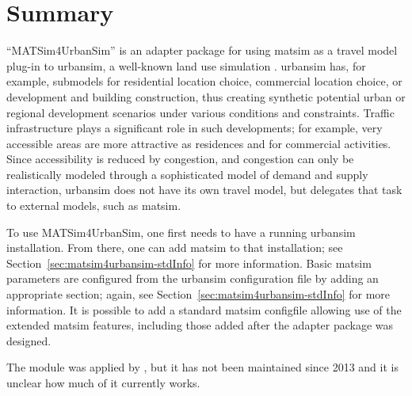 \section{Summary}
``MATSim4UrbanSim'' is an adapter package for using \gls{matsim} as a travel model plug-in to \gls{urbansim}, a well-known land use simulation \citep[e.g.][see \url{http://www.urbansim.org}]{WaddellEtc2003UrbanSim}.
\gls{urbansim} has, for example, submodels for residential location choice, commercial location choice, or development and building construction, thus creating synthetic  potential urban or regional development scenarios under various conditions and constraints. 
Traffic infrastructure plays a significant role in such developments; for example, very accessible areas are more attractive as residences and for commercial activities. 
Since accessibility is reduced by congestion, and congestion can only be realistically modeled through a sophisticated model of demand and supply interaction, \gls{urbansim} does not have its own travel model, but delegates that task to external models, such as \gls{matsim}.

To use MATSim4UrbanSim, one first needs to have a running \gls{urbansim} installation. 
From there, one can add \gls{matsim} to that installation; see Section~\ref{sec:matsim4urbansim-stdInfo} for more information. 
Basic \gls{matsim} parameters are configured from the \gls{urbansim} configuration file by adding an appropriate section; again, see Section~\ref{sec:matsim4urbansim-stdInfo} for more information. 
It is possible to add a standard \gls{matsim} \gls{configfile} allowing use of the extended \gls{matsim} features, including those added after the adapter package was designed.

The module was applied by \citet[][]{ZoelligRenner_PhDThesis_2014}, but it has not been maintained since 2013 and it is unclear how much of it currently works.





